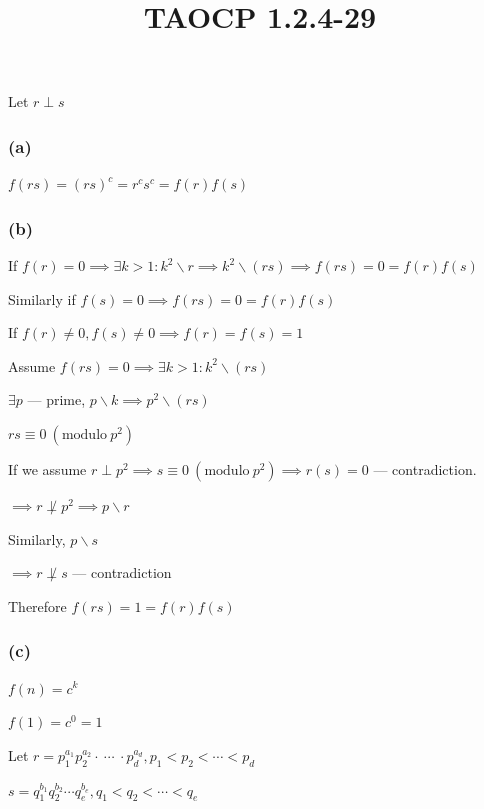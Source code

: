 \documentclass{article}
\title{TAOCP 1.2.4\mbox{-}29}
\begin{document}
\maketitle

Let \( r \perp s \)

\subsubsection*{(a)}

\( f(rs) = {(rs)}^{c}=r^{c}s^{c} = f(r)f(s) \)

\subsubsection*{(b)}

If \( f(r) = 0 \implies \exists k > 1: k^{2} \backslash r \implies k^{2} \backslash (rs) \implies f(rs) = 0 = f(r)f(s) \)

Similarly if \( f(s) = 0 \implies f(rs) = 0 = f(r)f(s) \)

If \( f(r) \neq 0, f(s) \neq 0 \implies f(r)=f(s)=1 \)

Assume \( f(rs) = 0 \implies \exists k > 1: k^{2} \backslash (rs) \)

\( \exists p \) --- prime, \( p \backslash k \implies p^{2} \backslash (rs) \)

\( rs \equiv 0 \ (\mathrm{modulo}\ p^{2}) \)

If we assume \( r \perp p^{2} \implies s \equiv 0 \ (\mathrm{modulo}\ p^{2}) \implies r(s) = 0 \) --- contradiction.

\( \implies r \not\perp p^{2} \implies p \backslash r \)

Similarly, \( p \backslash s \)

\( \implies r \not\perp s \) --- contradiction

Therefore \( f(rs) = 1 = f(r)f(s) \)

\subsubsection*{(c)}

\( f(n) = c^{k} \)

\( f(1) = c^{0} = 1 \)

Let \( r = p_{1}^{a_{1}} p_{2}^{a_{2}} \cdot\ \cdots\ \cdot p_{d}^{a_{d}}, p_{1} < p_{2} < \cdots < p_{d} \)

\( s = q_{1}^{b_{1}} q_{2}^{b_{2}} \cdots q_{e}^{b_{e}}, q_{1} < q_{2} < \cdots < q_{e} \)
\end{document}
